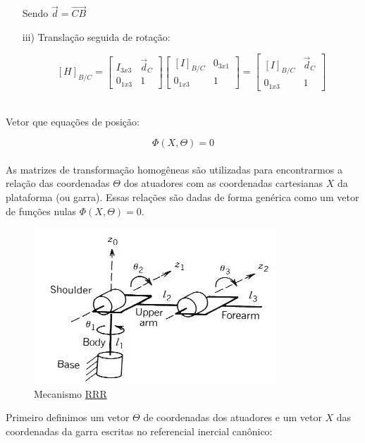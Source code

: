 \documentclass[12pt,a4paper]{article}
\begin{document}
\begin{itemize}
Sendo $\vec{d} =  \overrightarrow{CB}$

\item[iii)] Translação seguida de rotação:

$$ [H]_{B/C} =
\begin{bmatrix}
I_{3x3} & \vec{d}_C \\
0_{1x3} & 1
\end{bmatrix}
\begin{bmatrix}
[I]_{B/C} & 0_{3x1} \\
0_{1x3} & 1
\end{bmatrix}
=
\begin{bmatrix}
[I]_{B/C} & \vec{d}_C \\
0_{1x3} & 1
\end{bmatrix}
$$ \\

\end{itemize}
Vetor que equações de posição:

$$ \Phi(X, \Theta) = 0 $$ \\
As matrizes de transformação homogêneas são utilizadas para encontrarmos a relação das coordenadas $\Theta$ dos atuadores com as coordenadas cartesianas $X$ da plataforma (ou garra). Essas relações são dadas de forma genérica como um vetor de funções nulas $ \Phi(X, \Theta) = 0 $. \\




\begin{figure}[h!]
	\centering
	\includegraphics[scale=0.5]{RRR.jpg}  
	\caption{Mecanismo \underline{R}\underline{R}\underline{R}}
	\label{fig:figura1}
\end{figure}

Primeiro definimos um vetor $\Theta$ de coordenadas dos atuadores e um vetor $X$ das coordenadas da garra escritas no referencial inercial canônico:
\end{document}
